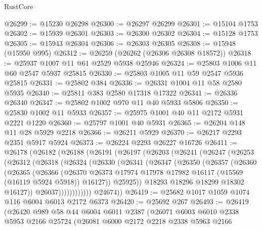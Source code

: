 \begin{lexlean}{RustCore}
\begin{coremodule}
@26299 := @15230 @26298
@26300 := @26297 @26299
@26301 := @15104 @1753
@26302 := @15939 @26301
@26303 := @26300 @26302
@26304 := @15128 @1753
@26305 := @15943 @26304
@26306 := @26303 @26305
@26308 := @15948 (@15950 @995)
@26312 := @26259 (@26262 (@26306 @26308 @18572))
@26318 := @25937 @1007 @11 @61 @2529 @5938 @25946
@26324 := @25803 @1006 @11 @60 @2547 @5937 @25815
@26330 := @25803 @1005 @11 @59 @2547 @5936 @25815
@26331 := @25802 @384
@26336 := @26331 @1004 @11 @58 @2580 @5935
@26340 := @25811 @383 @2580 @17318 @17322
@26341 := @26336 @26340
@26347 := @25802 @1002 @970 @11 @40 @5933 @5806
@26350 := @25830 @1002 @11 @5933
@26357 := @25975 @1001 @40 @11 @2172 @5931 @2221 @1220
@26360 := @25797 @1001 @40 @5931
@26365 := @26204 @148 @11 @28 @5929 @2218
@26366 := @26211 @5929
@26370 := @26217 @2293 @2351 @5917 @5924
@26373 := @26224 @2293 @26227 @16726
@26411 := @26178
    (@26182
      (@26188
        (@26191
          (@26197
            (@26203
              (@26241
                (@26247
                  (@26253
                    (@26312
                      (@26318
                        (@26324
                          (@26330
                            (@26341
                              (@26347
                                (@26350
                                  (@26357
                                    (@26360
                                      (@26365
                                        (@26366
                                          (@26370
                                            @26373
                                            @17974
                                            @17978
                                            @17982
                                            @16117
                                            (@15569 (@16119 @5924 @5918))
                                            @16127))
                                        @25925))
                                    @18293
                                    @18296
                                    @18299
                                    @18302
                                    @16127))
                                @26037))))))))))))
        @24674))
@26419 := @25682 @1017 @1059 @1074 @116 @6004 @6013 @2172 @6373
@26420 := @25692 @267
@26493 := @26419
    (@26420
      @989
      @58
      @44
      @6004
      @6011
      @2387
      (@26071
        @6003
        @6010
        @2338
        @5953
        @2166
        @25724
        (@26081
          @6000
          @2172
          @2218
          @2338
          @5963
          @2166

\end{coremodule}
\end{lexlean}
